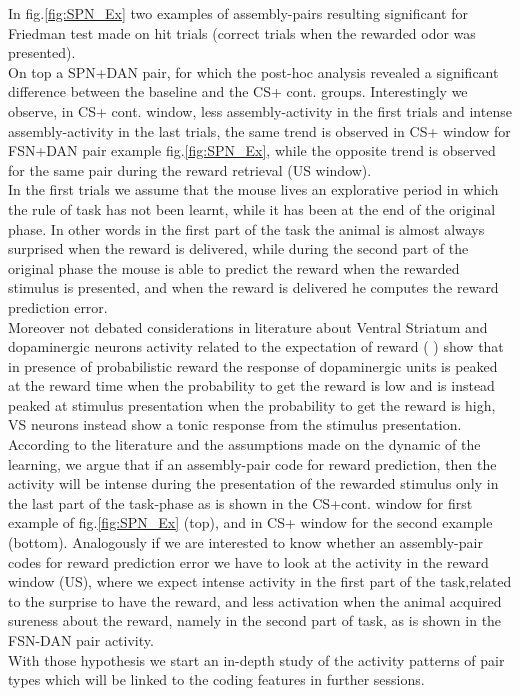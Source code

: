 In fig.\ref{fig:SPN_Ex} two examples of assembly-pairs resulting significant for Friedman test made on hit trials (correct trials when the rewarded odor was presented).\\On top a SPN+DAN pair, for which the post-hoc analysis revealed a significant difference between the baseline and the CS+ cont. groups. Interestingly we observe, in CS+ cont. window, less assembly-activity in the first trials and intense assembly-activity in the last trials, the same trend is observed in CS+ window for FSN+DAN pair example fig.\ref{fig:SPN_Ex}, while the opposite trend is observed for the same pair during the reward retrieval (US window).\\In the first trials we assume that the mouse lives an explorative period in which the rule of task has not been learnt, while it has been at the end of the original phase. In other words in the first part of the task the animal is almost always surprised when the reward is delivered, while during the second part of the original phase the mouse is able to predict the reward when the rewarded stimulus is presented, and when the reward is delivered he computes the reward prediction error.\\Moreover not debated considerations in literature about Ventral Striatum and dopaminergic neurons activity related to the expectation of reward (\cite{Schultz1992} \cite{Schultz} \cite{Fiorillo}) show that in presence of probabilistic reward the response of dopaminergic units is peaked at the reward time when the probability to get the reward is low and is instead peaked at stimulus presentation when the probability to get the reward is high, VS neurons instead show a tonic response from the stimulus presentation.\\According to the literature and the assumptions made on the dynamic of the learning, we argue that if an assembly-pair code for reward prediction, then the activity will be intense during the presentation of the rewarded stimulus only in the last part of the task-phase as is shown in the CS+cont. window for first example of fig.\ref{fig:SPN_Ex} (top), and in CS+ window for the second example (bottom). Analogously if we are interested to know whether an assembly-pair codes for reward prediction error we have to look at the activity in the reward window (US), where we expect intense activity in the first part of the task,related to the surprise to have the reward, and less activation when the animal acquired sureness about the reward, namely in the second part of task, as is shown in the FSN-DAN pair activity.\\With those hypothesis we start an in-depth study of the activity patterns of pair types which will be linked to the coding features in further sessions.\\
